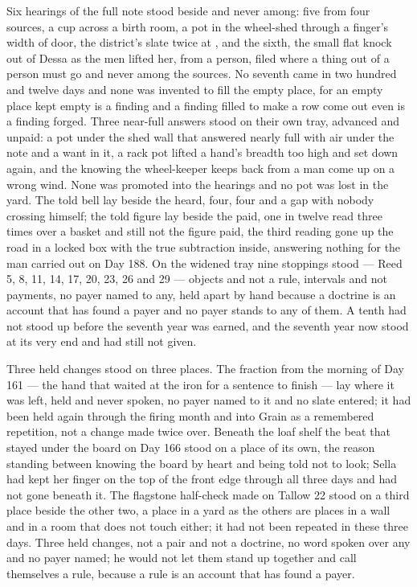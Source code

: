 Six hearings of the full note stood beside and never among: five from four sources, a cup across a birth room, a pot in the wheel-shed through a finger's width of door, the district's slate twice at , and the sixth, the small flat knock out of Dessa as the men lifted her, from a person, filed where a thing out of a person must go and never among the sources. No seventh came in two hundred and twelve days and none was invented to fill the empty place, for an empty place kept empty is a finding and a finding filled to make a row come out even is a finding forged. Three near-full answers stood on their own tray, advanced and unpaid: a pot under the shed wall that answered nearly full with air under the note and a want in it, a rack pot lifted a hand's breadth too high and set down again, and the knowing the wheel-keeper keeps back from a man come up on a wrong wind. None was promoted into the hearings and no pot was lost in the yard. The told bell lay beside the heard, four, four and a gap with nobody crossing himself; the told figure lay beside the paid, one in twelve read three times over a basket and still not the figure paid, the third reading gone up the road in a locked box with the true subtraction inside, answering nothing for the man carried out on Day 188. On the widened tray nine stoppings stood --- Reed 5, 8, 11, 14, 17, 20, 23, 26 and 29 --- objects and not a rule, intervals and not payments, no payer named to any, held apart by hand because a doctrine is an account that has found a payer and no payer stands to any of them. A tenth had not stood up before the seventh year was earned, and the seventh year now stood at its very end and had still not given.

Three held changes stood on three places. The fraction from the morning of Day 161 --- the hand that waited at the iron for a sentence to finish --- lay where it was left, held and never spoken, no payer named to it and no slate entered; it had been held again through the firing month and into Grain as a remembered repetition, not a change made twice over. Beneath the loaf shelf the beat that stayed under the board on Day 166 stood on a place of its own, the reason standing between knowing the board by heart and being told not to look; Sella had kept her finger on the top of the front edge through all three days and had not gone beneath it. The flagstone half-check made on Tallow 22 stood on a third place beside the other two, a place in a yard as the others are places in a wall and in a room that does not touch either; it had not been repeated in these three days. Three held changes, not a pair and not a doctrine, no word spoken over any and no payer named; he would not let them stand up together and call themselves a rule, because a rule is an account that has found a payer.


